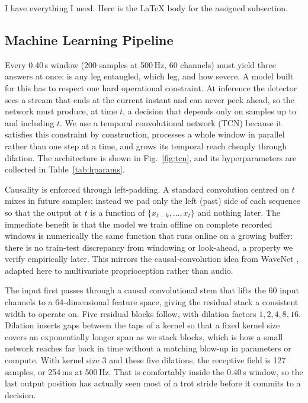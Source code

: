 I have everything I need. Here is the LaTeX body for the assigned subsection.

\subsection{Machine Learning Pipeline}

Every 0.40\,s window (200 samples at 500\,Hz, 60 channels) must yield three answers at once: is any leg entangled, which leg, and how severe. A model built for this has to respect one hard operational constraint. At inference the detector sees a stream that ends at the current instant and can never peek ahead, so the network must produce, at time $t$, a decision that depends only on samples up to and including $t$. We use a temporal convolutional network (TCN) \cite{bai2018tcn} because it satisfies this constraint by construction, processes a whole window in parallel rather than one step at a time, and grows its temporal reach cheaply through dilation. The architecture is shown in Fig.~\ref{fig:tcn}, and its hyperparameters are collected in Table~\ref{tab:hparams}.

Causality is enforced through left-padding. A standard convolution centred on $t$ mixes in future samples; instead we pad only the left (past) side of each sequence so that the output at $t$ is a function of $\{x_{t-k},\dots,x_t\}$ and nothing later. The immediate benefit is that the model we train offline on complete recorded windows is numerically the same function that runs online on a growing buffer: there is no train-test discrepancy from windowing or look-ahead, a property we verify empirically later. This mirrors the causal-convolution idea from WaveNet \cite{oord2016wavenet}, adapted here to multivariate proprioception rather than audio.

The input first passes through a causal convolutional stem that lifts the 60 input channels to a 64-dimensional feature space, giving the residual stack a consistent width to operate on. Five residual blocks follow, with dilation factors $1,2,4,8,16$. Dilation inserts gaps between the taps of a kernel so that a fixed kernel size covers an exponentially longer span as we stack blocks, which is how a small network reaches far back in time without a matching blow-up in parameters or compute. With kernel size 3 and these five dilations, the receptive field is 127 samples, or 254\,ms at 500\,Hz. That is comfortably inside the 0.40\,s window, so the last output position has actually seen most of a trot stride before it commits to a decision.


